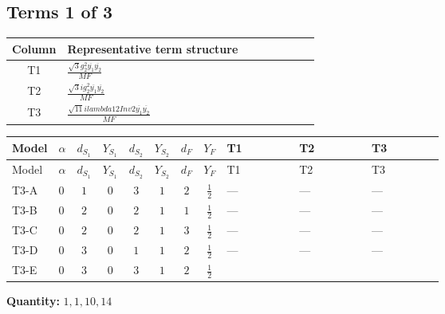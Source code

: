 \documentclass[8pt]{article}
\begin{document}
\begin{landscape}
\subsection*{Terms 1 of 3}
\begin{center}
\begin{tabular}{@{}c >{\raggedright\arraybackslash}p{0.82\linewidth}@{}}
\toprule
Column & Representative term structure \\
\midrule
T1 & \(\displaystyle \frac{\sqrt{3} g_{2}^{2} \overline{y_{1}} \overline{y_{2}}}{MF}\) \\
\midrule
T2 & \(\displaystyle \frac{\sqrt{3} i g_{2}^{2} \overline{y_{1}} \overline{y_{2}}}{MF}\) \\
\midrule
T3 & \(\displaystyle \frac{\sqrt{11} i lambda12Inv2 \overline{y_{1}} \overline{y_{2}}}{MF}\) \\
\midrule
\bottomrule
\end{tabular}
\end{center}
\smallskip
\tiny
\begin{longtable}{@{}llcccccc >{\raggedright\arraybackslash}p{0.21\linewidth} >{\raggedright\arraybackslash}p{0.21\linewidth} >{\raggedright\arraybackslash}p{0.21\linewidth}@{}}
\toprule
Model & $\alpha$ & $d_{S_1}$ & $Y_{S_1}$ & $d_{S_2}$ & $Y_{S_2}$ & $d_F$ & $Y_F$ & T1 & T2 & T3 \\
\midrule
\endfirsthead
\toprule
Model & $\alpha$ & $d_{S_1}$ & $Y_{S_1}$ & $d_{S_2}$ & $Y_{S_2}$ & $d_F$ & $Y_F$ & T1 & T2 & T3 \\
\midrule
\endhead
T3-A & $0$ & $1$ & $0$ & $3$ & $1$ & $2$ & $\frac{1}{2}$ & --- & --- & --- \\
\midrule
T3-B & $0$ & $2$ & $0$ & $2$ & $1$ & $1$ & $\frac{1}{2}$ & --- & --- & --- \\
\midrule
T3-C & $0$ & $2$ & $0$ & $2$ & $1$ & $3$ & $\frac{1}{2}$ & --- & --- & --- \\
\midrule
T3-D & $0$ & $3$ & $0$ & $1$ & $1$ & $2$ & $\frac{1}{2}$ & --- & --- & --- \\
\midrule
T3-E & $0$ & $3$ & $0$ & $3$ & $1$ & $2$ & $\frac{1}{2}$ & \scriptsize\adjustbox{max width=\linewidth}{$\begin{gathered} - \frac{\sqrt{3} g_{2}^{2} \overline{y_{1}} \overline{y_{2}}}{6 MF}\end{gathered}$} & \scriptsize\adjustbox{max width=\linewidth}{$\begin{gathered} - \frac{49 \sqrt{3} i g_{2}^{2} \overline{y_{1}} \overline{y_{2}}}{24 MF}\end{gathered}$} & \scriptsize\adjustbox{max width=\linewidth}{$\begin{gathered} - \frac{3 \sqrt{11} i lambda12Inv2 \overline{y_{1}} \overline{y_{2}}}{22 MF}\end{gathered}$} \\
\midrule
\bottomrule
\end{longtable}
\clearpage
\noindent\textbf{Quantity: }$\mathrm{1,1,10,14}$\par\smallskip

\end{landscape}
\end{document}
